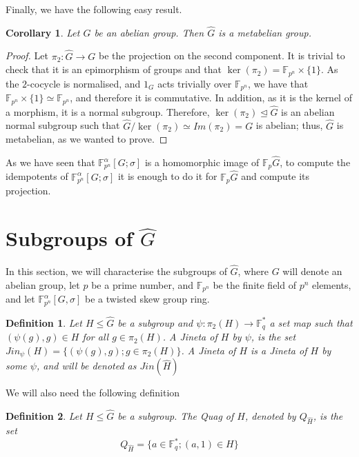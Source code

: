 \documentclass{article}
\newtheorem{corollary}[theorem]{Corollary}
\newtheorem{definition}{Definition}
\begin{document}
Finally, we have the following easy result.
\begin{corollary}
    Let $G$ be an abelian group. Then $\hat{G}$ is a metabelian group.
\end{corollary}
\begin{proof}
    Let $\pi_2 : \hat{G} \longrightarrow G$ be the projection on the second component. It is trivial to check that it is an epimorphism of groups and that $\ker (\pi_2) = \mathbb{F}_{p^n} \times \{1\}$. As the $2$-cocycle is normalised, and $1_G$ acts trivially over $\mathbb{F}_{p^n}$, we have that $\mathbb{F}_{p^n} \times \{1\} \simeq \mathbb{F}_{p^n}$, and therefore it is commutative. In addition, as it is the kernel of a morphism, it is a normal subgroup. Therefore, $\ker(\pi_2) \trianglelefteq \hat{G}$ is an abelian normal subgroup such that $\hat{G} / \ker(\pi_2) \simeq Im(\pi_2) = G$ is abelian; thus, $\hat{G}$ is metabelian, as we wanted to prove. 
\end{proof}

As we have seen that $\mathbb{F}_{p^n}^\alpha[G; \sigma]$ is a homomorphic image of $\mathbb{F}_p\hat{G}$, to compute the idempotents of $\mathbb{F}_{p^n}^\alpha[G; \sigma]$ it is enough to do it for $\mathbb{F}_p\hat{G}$ and compute its projection. 

\section{Subgroups of $\hat{G}$}
In this section, we will characterise the subgroups of $\hat{G}$, where $G$ will denote an abelian group, let $p$ be a prime number, and $\mathbb{F}_{p^n}$ be the finite field of $p^n$ elements, and let $\mathbb{F}_{p^n}^\alpha[G,\sigma]$ be a twisted skew group ring.

\begin{definition}
    Let $H\leq \hat{G}$ be a subgroup and  $\psi : \pi_2(H)\longrightarrow \mathbb{F}_q^*$ a set map such that $(\psi(g),g)\in H$ for all $g\in \pi_2(H)$. A Jineta of $H$ by $\psi$, is the set $Jin_\psi (H)=\{(\psi(g),g) ; g\in \pi_2(H)\}$. A Jineta of $H$ is a Jineta of $H$ by some $\psi$, and will be denoted as $Jin(\hat{H})$
\end{definition}

We will also need the following definition
\begin{definition}
     Let $H\leq \hat{G}$ be a subgroup. The Quag of $H$, denoted by $Q_{\hat{H}}$, is the set
     \begin{equation}
         Q_{\hat{H}} = \{a\in \mathbb{F}_q^* ; (a,1) \in H\}
     \end{equation}
\end{definition}
\end{document}
